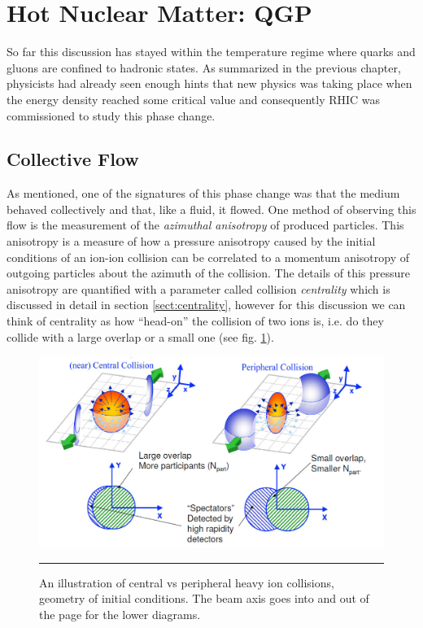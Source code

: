 \section{Hot Nuclear Matter: QGP}
So far this discussion has stayed within the temperature regime where quarks and gluons are confined to hadronic states. As summarized in the previous chapter, physicists had already seen enough hints that new physics was taking place when the energy density reached some critical value and consequently RHIC was commissioned to study this phase change.

\subsection{Collective Flow}
As mentioned, one of the signatures of this phase change was that the medium behaved collectively and that, like a fluid, it flowed. One method of observing this flow is the measurement of the \textit{azimuthal anisotropy} of produced particles. This anisotropy is a measure of how a pressure anisotropy caused by the initial conditions of an ion-ion collision can be correlated to a momentum anisotropy of outgoing particles about the azimuth of the collision. The details of this pressure anisotropy are quantified with a parameter called collision \textit{centrality} which is discussed in detail in section \ref{sect:centrality}, however for this discussion we can think of centrality as how ``head-on'' the collision of two ions is, i.e. do they collide with a large overlap or a small one (see fig. \ref{fig:centvsperiph1}).

\begin{figure}[htbp]
\centering
    \includegraphics[width=1\textwidth]{Figures/centralvsperipheral.jpg}    
\rule{35em}{0.5pt}
	\caption[Central vs Peripheral collisions, geometry of initial conditions]{An illustration of central vs peripheral heavy ion collisions, geometry of initial conditions. The beam axis goes into and out of the page for the lower diagrams.}
\label{fig:centvsperiph1}
\end{figure}

